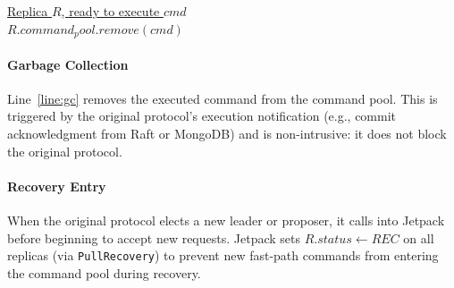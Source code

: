 \documentclass[twocolumn]{article}
\begin{document}
\begin{algorithm}
\caption{Original Protocol -- Execute (with GC)}
\label{alg:execute_gc}
\setcounter{AlgoLine}{26}

\underline{Replica $R$, ready to execute $cmd$}\\
$R.command_pool.remove(cmd)$\label{line:gc}
\end{algorithm}

\paragraph{Garbage Collection}
Line~\ref{line:gc} removes the executed command from the command pool. This is triggered by the original protocol's execution notification (e.g., commit acknowledgment from Raft or MongoDB) and is non-intrusive: it does not block the original protocol.



\paragraph{Recovery Entry}
When the original protocol elects a new leader or proposer, it calls into Jetpack before beginning to accept new requests. Jetpack sets $R.status \gets REC$ on all replicas (via \texttt{PullRecovery}) to prevent new fast-path commands from entering the command pool during recovery.
\end{document}
